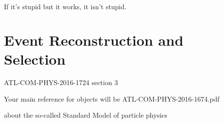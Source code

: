 \begin{savequote}[75mm]
If it's stupid but it works, it isn't stupid.
\end{savequote}

\chapter{Event Reconstruction and Selection}
ATL-COM-PHYS-2016-1724 section 3

Your main reference for objects will be ATL-COM-PHYS-2016-1674.pdf

 about the so-called Standard Model of particle physics


